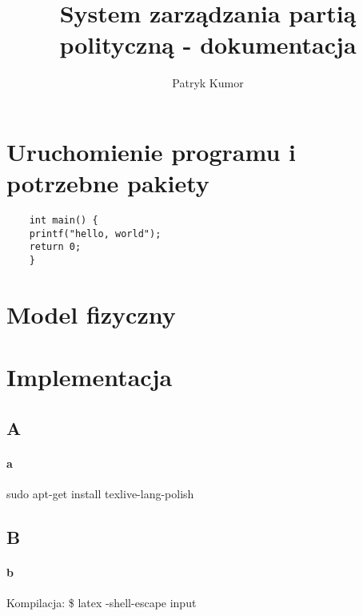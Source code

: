 \documentclass{article}
\title{System zarządzania partią polityczną - dokumentacja}
\author{Patryk Kumor}
\begin{document}
  \maketitle
  \newpage
  \tableofcontents
  \newpage


\section{Uruchomienie programu i potrzebne pakiety}

	\begin{verbatim}
	int main() {
	printf("hello, world");
	return 0;
	}
	\end{verbatim}


\newpage
\section{Model fizyczny}


\newpage
\section{Implementacja}

\subsection{ A } 
\paragraph{ a }  
sudo apt-get install texlive-lang-polish
\subsection{ B } 
\paragraph{ b } 
Kompilacja: \$ latex -shell-escape input
\end{document}
